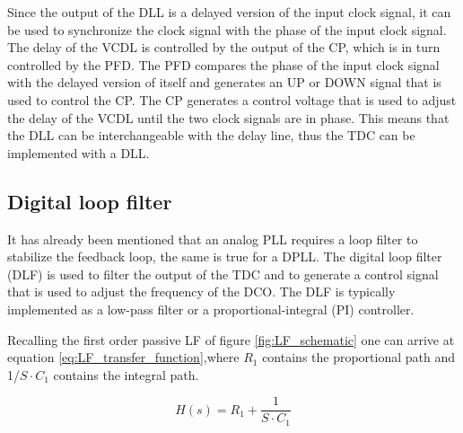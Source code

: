 Since the output of the DLL is a delayed version of the input clock signal, it can be used to synchronize the clock signal with the phase of the input clock signal. The delay of the 
VCDL is controlled by the output of the CP, which is in turn controlled by the PFD. The PFD compares the phase of the input clock signal with the delayed version of itself and 
generates an UP or DOWN signal that is used to control the CP. The CP generates a control voltage that is used to adjust the delay of the VCDL until the two clock signals are in phase.
This means that the DLL can be interchangeable with the delay line, thus the TDC can be implemented with a DLL.

\subsection{Digital loop filter}

It has already been mentioned that an analog PLL requires a loop filter to stabilize the feedback loop, the same is true for a DPLL. The digital loop filter (DLF) is used to filter the 
output of the TDC and to generate a control signal that is used to adjust the frequency of the DCO. The DLF is typically implemented as a low-pass filter or a proportional-integral (PI)
controller.

Recalling the first order passive LF of figure \ref{fig:LF_schematic} one can arrive at equation \eqref{eq:LF_transfer_function},where $R_1$ contains the proportional path and 
1/$S \cdot C_1$ contains the integral path.

\begin{equation}
    H(s) = R_1 + \frac{1}{S \cdot C_1}
    \label{eq:LF_transfer_function}
\end{equation}

